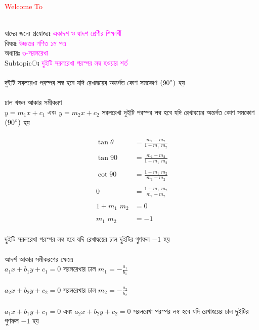 \documentclass{article}
\begin{document}
 
	\Large
	\textcolor{red}{Welcome To} 
	\\
	\\
	যাদের জন্যে প্রযোজ্যঃ  	\textcolor{magenta}{একাদশ ও দ্বাদশ শ্রেণীর শিক্ষার্থী} \\
	বিষয়ঃ \textcolor{magenta}{উচ্চতর গণিত ১ম পত্র} \\
	অধ্যায়ঃ \textcolor{magenta}{৩-সরলরেখা}\\ 
	Subtopicঃ  \textcolor{magenta}{  দুইটি সরলরেখা পরস্পর লম্ব হওয়ার শর্ত   }\\
	\\
	দুইটি সরলরেখা পরস্পর লম্ব হবে যদি রেখাদ্বয়ের অন্তর্গত কোণ  সমকোণ $(90\degree)$ হয় \\
	\\ 
	ঢাল খন্ডন আকার সমীকরণ\\
	$y=m_1x+c_1$ এবং $y=m_2x+c_2$ সরলরেখা দুইটি পরস্পর লম্ব হবে যদি রেখাদ্বয়ের অন্তর্গত কোণ  সমকোণ $(90\degree)$ হয় \\
	\\ 
	\begin{align*}
		\tan \theta  &= \frac{m_1-m_2}{1+m_1\,\,m_2}\\
		\\
		\tan  90  &= \frac{m_1-m_2}{1+m_1\,\,m_2}\\
		\\
	\cot	90 &= \frac{1+m_1\,\,m_2}{m_1-m_2}\\
		\\
	0 &= \frac{1+m_1\,\,m_2}{m_1-m_2}\\
		\\
	1+m_1\,\,m_2&=0\\
	\\
	m_1\,\,m_2&=-1
	\end{align*}
	\\
	দুইটি সরলরেখা পরস্পর লম্ব  হবে যদি  রেখাদ্বয়ের  ঢাল দুইটির গুণফল $-1$ হয় \\
	\\ 
	আদর্শ আকার সমীকরণের ক্ষেত্রে \\
	$a_1x+b_1y+c_1=0$  সরলরেখার ঢাল  $m_1=-\frac{a_1}{b_1}$\\
	\\
	$a_2x+b_2y+c_2=0$  সরলরেখার ঢাল  $m_2=-\frac{a_2}{b_2}$\\
	\\
	$a_1x+b_1y+c_1=0$ এবং 	$a_2x+b_2y+c_2=0$  সরলরেখা পরস্পর লম্ব  হবে যদি  রেখাদ্বয়ের  ঢাল দুইটির গুণফল $-1$ হয় \\
\end{document}
